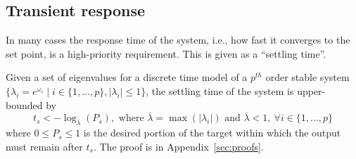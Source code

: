 \documentclass[sigconf]{llncs}
\newcommand{\mat}[1]{{#1}}
\renewcommand{\vec}[1]{{#1}}
\begin{document}

\subsection{Transient response} 
\label{sec:transientspecification}

In many cases the response time of the system, i.e., how fast it converges
to the set point, is a high-priority requirement.  This is given as a
``settling time''.
 
\begin{theorem}
%
Given a set of eigenvalues for a discrete time model of a $p^{th}$ order
stable system $\{\lambda_i =e^{\omega_i} \mid i \in \{1, \ldots,p\},
|\lambda_i| \leq 1 \}$, the settling time of the system is upper-bounded by
%
\begin{equation}
%
t_s<-\log_{\overline{\lambda}}({P_s}), \text{ where }
  \overline{\lambda} = \max(|\lambda_i|) \text{ and }
  \overline{\lambda}<1,\ \forall i \in \{1, \ldots,p\}
%
\label{eq:set_time}
\end{equation}
%
where $0\leq P_s \leq 1$ is the desired portion of the target within which
the output must remain after $t_s$.  The proof is in
Appendix~\ref{sec:proofs}.
%
\end{theorem}
\end{document}
